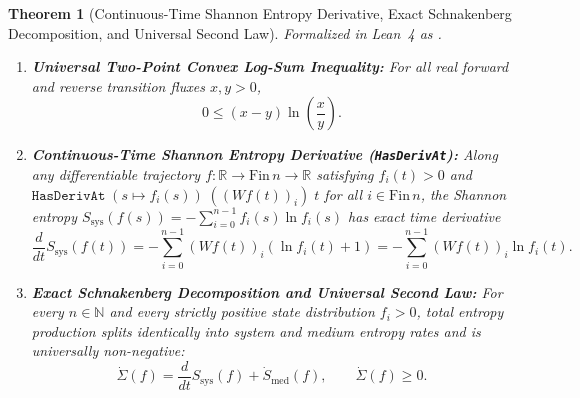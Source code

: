\documentclass[11pt,a4paper]{article}
\newtheorem{theorem}{Theorem}[section]
\theoremstyle{definition}
\begin{document}
\begin{theorem}[Continuous-Time Shannon Entropy Derivative, Exact Schnakenberg Decomposition, and Universal Second Law]
\label{thm:schnakenberg_second_law}
Formalized in Lean~4 as \texttt{}.
\begin{enumerate}
  \item \textbf{Universal Two-Point Convex Log-Sum Inequality:} For all real forward and reverse transition fluxes $x, y > 0$,
  \begin{equation}
    0 \le (x - y)\ln\!\left(\frac{x}{y}\right).
  \end{equation}
  \item \textbf{Continuous-Time Shannon Entropy Derivative (\texttt{HasDerivAt}):} Along any differentiable trajectory $f : \mathbb{R} \to \mathrm{Fin}\,n \to \mathbb{R}$ satisfying $f_i(t) > 0$ and $\texttt{HasDerivAt}\;(s \mapsto f_i(s))\;((Wf(t))_i)\;t$ for all $i \in \mathrm{Fin}\,n$, the Shannon entropy $S_{\mathrm{sys}}(f(s)) = -\sum_{i=0}^{n-1} f_i(s)\ln f_i(s)$ has exact time derivative
  \begin{equation}
    \frac{d}{dt}S_{\mathrm{sys}}(f(t)) = -\sum_{i=0}^{n-1} (Wf(t))_i \left(\ln f_i(t) + 1\right) = -\sum_{i=0}^{n-1} (Wf(t))_i \ln f_i(t).
  \end{equation}
  \item \textbf{Exact Schnakenberg Decomposition and Universal Second Law:} For every $n \in \mathbb{N}$ and every strictly positive state distribution $f_i > 0$, total entropy production splits identically into system and medium entropy rates and is universally non-negative:
  \begin{equation}
    \dot{\Sigma}(f) = \frac{d}{dt}S_{\mathrm{sys}}(f) + \dot{S}_{\mathrm{med}}(f), \qquad \dot{\Sigma}(f) \ge 0.
  \end{equation}
\end{enumerate}
\end{theorem}
\end{document}
